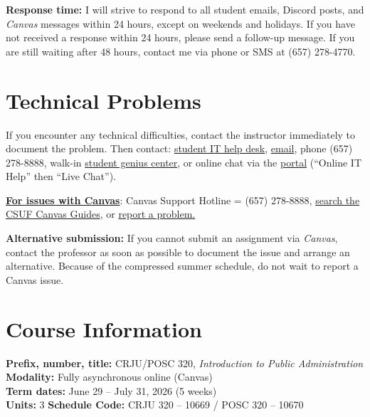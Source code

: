 \documentclass[12pt]{article}
\begin{document}
\vspace{0.5em}
\noindent \textbf{Response time:} I will strive to respond to all student emails, Discord posts, and \emph{Canvas} messages within 24 hours, except on weekends and holidays. If you have not received a response within 24 hours, please send a follow-up message. If you are still waiting after 48 hours, contact me via phone or SMS at (657) 278-4770.

\section*{Technical Problems}

If you encounter any technical difficulties, contact the instructor immediately to document the problem. Then contact: \href{http://www.fullerton.edu/it/students/helpdesk/index.php}{student IT help desk}, \href{mailto:StudentITHelpDesk@fullerton.edu}{email}, phone (657) 278-8888, walk-in \href{http://www.fullerton.edu/it/students/sgc/index.php}{student genius center}, or online chat via the \href{http://my.fullerton.edu}{portal} (``Online IT Help'' then ``Live Chat'').

\vspace{0.5em}
\noindent \textbf{\underline{For issues with Canvas}}: Canvas Support Hotline = (657) 278-8888, \href{https://canvashelp.fullerton.edu/}{search the CSUF Canvas Guides}, or \href{https://titans.service-now.com/sp?id=sc_cat_item&sys_id=f88efe80ebea6a10fb7cfcffcad0cdc6&subject=Canvas}{report a problem.}

\vspace{0.5em}
\noindent \textbf{Alternative submission:} If you cannot submit an assignment via \emph{Canvas}, contact the professor as soon as possible to document the issue and arrange an alternative. Because of the compressed summer schedule, do not wait to report a Canvas issue.

\section*{Course Information}
\noindent \textbf{Prefix, number, title:} CRJU/POSC 320, \textit{Introduction to Public Administration} \\
\noindent \textbf{Modality:} Fully asynchronous online (Canvas) \\
\noindent \textbf{Term dates:} June 29 -- July 31, 2026 (5 weeks) \\
\noindent \textbf{Units:} 3 \quad \textbf{Schedule Code:} CRJU 320 -- 10669 / POSC 320 -- 10670
\end{document}
